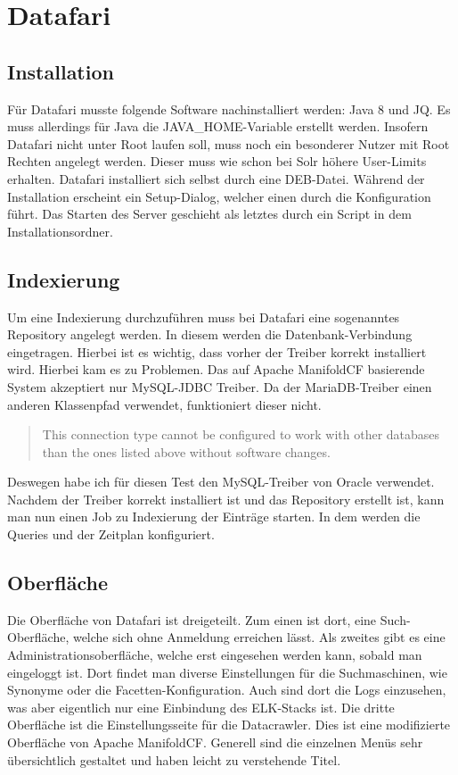 
\section{Datafari}

\subsection{Installation}

Für Datafari musste folgende Software nachinstalliert werden: Java 8 und JQ. Es muss allerdings für Java die JAVA\_HOME-Variable erstellt werden. Insofern Datafari nicht unter Root laufen soll, muss noch ein besonderer Nutzer mit Root Rechten angelegt werden. Dieser muss wie schon bei Solr höhere User-Limits erhalten. Datafari installiert sich selbst durch eine DEB-Datei. Während der Installation erscheint ein Setup-Dialog, welcher einen durch die Konfiguration führt. Das Starten des Server geschieht als letztes durch ein Script in dem Installationsordner.

\subsection{Indexierung}

Um eine Indexierung durchzuführen muss bei Datafari eine sogenanntes Repository angelegt werden. In diesem werden die Datenbank-Verbindung eingetragen. Hierbei ist es wichtig, dass vorher der Treiber korrekt installiert wird. Hierbei kam es zu Problemen. Das auf Apache ManifoldCF basierende System akzeptiert nur MySQL-JDBC Treiber. Da der MariaDB-Treiber einen anderen Klassenpfad verwendet, funktioniert dieser nicht. \begin{quote} This connection type cannot be configured to work with other databases than the ones listed above without software changes.~\cite[S.~61]{ApacheSoftwareFoundation.}\end{quote} Deswegen habe ich für diesen Test den MySQL-Treiber von Oracle verwendet.
Nachdem der Treiber korrekt installiert ist und das Repository erstellt ist, kann man nun einen Job zu Indexierung der Einträge starten. In dem werden die Queries und der Zeitplan konfiguriert.


\subsection{Oberfläche}

Die Oberfläche von Datafari ist dreigeteilt. Zum einen ist dort, eine Such-Oberfläche, welche sich ohne Anmeldung erreichen lässt. Als zweites gibt es eine Administrationsoberfläche, welche erst eingesehen werden kann, sobald man eingeloggt ist. Dort findet man diverse Einstellungen für die Suchmaschinen, wie Synonyme oder die Facetten-Konfiguration. Auch sind dort die Logs einzusehen, was aber eigentlich nur eine Einbindung des ELK-Stacks ist. Die dritte Oberfläche ist die Einstellungsseite für die Datacrawler. Dies ist eine modifizierte Oberfläche von Apache ManifoldCF. Generell sind die einzelnen Menüs sehr übersichtlich gestaltet und haben leicht zu verstehende Titel.

